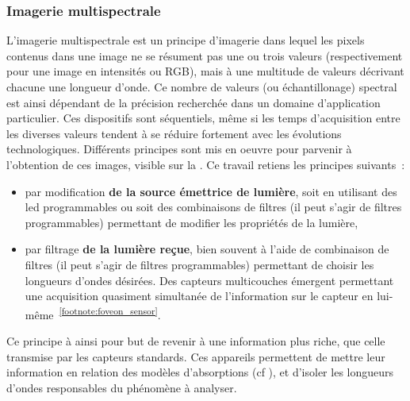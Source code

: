 \subsubsection{Imagerie multispectrale}
L'imagerie multispectrale est un principe d'imagerie dans lequel les pixels contenus dans une image ne se résument pas une ou trois valeurs (respectivement pour une image en intensités ou RGB), mais à une multitude de valeurs décrivant chacune une longueur d'onde. Ce nombre de valeurs (ou échantillonage) spectral est ainsi dépendant de la précision recherchée dans un domaine d'application particulier. Ces dispositifs sont séquentiels, même si les temps d'acquisition entre les diverses valeurs tendent à se réduire fortement avec les évolutions technologiques. Différents principes sont mis en oeuvre pour parvenir à l'obtention de ces images, visible sur la . Ce travail retiens les principes suivants~:
\begin{itemize}
\item par modification \textbf{de la source émettrice de lumière}, soit en utilisant des \gls{led} programmables ou soit des combinaisons de filtres (il peut s'agir de filtres programmables) permettant de modifier les propriétés de la lumière,
\item par filtrage \textbf{de la lumière reçue}, bien souvent à l'aide de combinaison de filtres (il peut s'agir de filtres programmables) permettant de choisir les longueurs d'ondes désirées. Des capteurs multicouches émergent permettant une acquisition quasiment simultanée de l'information sur le capteur en lui-même~\textsuperscript{\ref{footnote:foveon_sensor}}.
\end{itemize}\par

Ce principe à ainsi pour but de revenir à une information plus riche, que celle transmise par les capteurs standards. Ces appareils permettent de mettre leur information en relation des modèles d'absorptions (cf ), et d'isoler les longueurs d'ondes responsables du phénomène à analyser.\par 

\addtocounter{footnote}{1}

